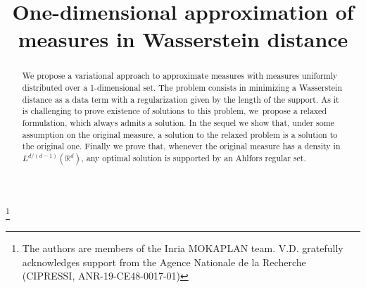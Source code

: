\documentclass[JEP,XML,SOM,Unicode,NoFloatCountersInSection,published]{cedram}
\theoremstyle{definition}
\begin{document}
\frontmatter
\title{One-dimensional approximation of measures in Wasserstein distance}

\author[\initial{A.} \lastname{Chambolle}]{ }
\address{CEREMADE, CNRS, Université Paris-Dauphine, PSL,\\ 75775 Paris, France\\
\& Inria}

\author[\initial{V.} \lastname{Duval}]{ }
\address{CEREMADE, CNRS, Université Paris-Dauphine, PSL,\\ 75775 Paris, France\\
\& Inria}

\author[\initial{J. M.} \lastname{Machado}]{\nobreakauthor {}}
\address{CEREMADE, CNRS, Université Paris-Dauphine, PSL,\\ 75775 Paris, France\\
\& Inria}
\urladdr{}

\thanks{The authors are members of the Inria MOKAPLAN team. V.D. gratefully acknowledges support from the Agence Nationale de la Recherche (CIPRESSI, ANR-19-CE48-0017-01)}

\begin{abstract}
We propose a variational approach to approximate measures with measures uniformly distributed over a 1-dimensional set. The problem consists in minimizing a Wasserstein distance as a data term with a regularization given by the length of the support. As it is challenging to prove existence of solutions to this problem, we~propose a relaxed formulation, which always admits a solution. In the sequel we show that, under some assumption on the original measure, a solution to the relaxed problem is a solution to the original one. Finally we prove that, whenever the original measure has a density in $L^{d/(d-1)}(\mathbb{R}^d)$, any optimal solution is supported by an Ahlfors regular set.
\end{abstract}



\end{document}
